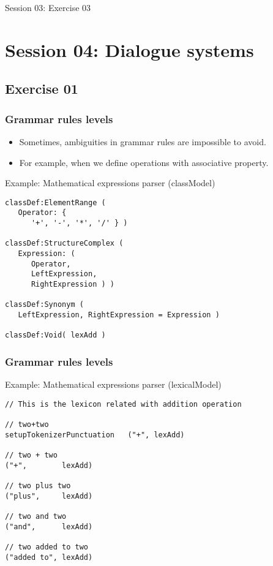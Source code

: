 \documentclass[11pt]{beamer}
\begin{document}
\begin{frame}[fragile]
\Huge
\begin{center}
Session 03: Exercise 03
\end{center}
\end{frame}

\section{Session 04: Dialogue systems}

\subsection{Exercise 01}

\begin{frame}[fragile]
\frametitle{Grammar rules levels}
\begin{itemize}
	\item Sometimes, ambiguities in grammar rules are impossible to avoid.
	\pause
	\item For example, when we define operations with associative property.
\end{itemize}
\begin{block}{Example: Mathematical expressions parser (classModel)}
\scriptsize
\begin{lstlisting}[language=lekta]
classDef:ElementRange (
   Operator: {
      '+', '-', '*', '/' } )

classDef:StructureComplex ( 
   Expression: (
      Operator, 
      LeftExpression, 
      RightExpression ) )

classDef:Synonym ( 
   LeftExpression, RightExpression = Expression )

classDef:Void( lexAdd )
\end{lstlisting}
\end{block}
\end{frame}

\begin{frame}[fragile]
\frametitle{Grammar rules levels}
\begin{block}{Example: Mathematical expressions parser (lexicalModel)}
\scriptsize
\begin{lstlisting}[language=lekta]
// This is the lexicon related with addition operation

// two+two
setupTokenizerPunctuation   ("+", lexAdd) 

// two + two
("+",        lexAdd)

// two plus two
("plus",     lexAdd)

// two and two
("and",      lexAdd)

// two added to two 
("added to", lexAdd)
\end{lstlisting}
\end{block}
\end{frame}
\end{document}
